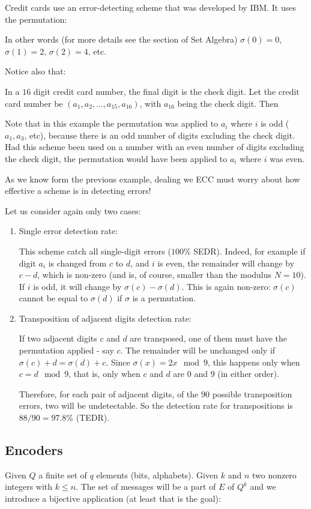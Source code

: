 	Credit cards use an error-detecting scheme that was developed by IBM. It uses the permutation:
	
	In other words (for more details see the section of Set Algebra) $\sigma (0)=0$, $\sigma (1)=2$, $\sigma (2)=4$, etc.
	
	Notice also that:
	

	In a $16$ digit credit card number, the final digit is the check digit. Let the credit card number be $(a_1, a_2,\ldots , a_{15}, a_{16})$, with $a_{16}$ being the check digit. Then
	
	Note that in this example the permutation was applied to $a_ i$ where $i$ is odd ($a_1, a_3$, etc), because there is an odd number of digits excluding the check digit. Had this scheme been used on a number with an even number of digits excluding the check digit, the permutation would have been applied to $a_ i$ where $i$ was even.
	
	As we know form the previous example, dealing we ECC must worry about how effective a scheme is in detecting errors!
	
	Let us consider again only two cases:
	\begin{enumerate}
		\item Single error detection rate:

		This scheme catch all single-digit errors ($100\%$ SEDR). Indeed, for example if digit $a_ i$ is changed from $c$ to $d$, and $i$ is even, the remainder will change by $c-d$, which is non-zero (and is, of course, smaller than the modulus $N=10$). If $i$ is odd, it will change by $\sigma (c)-\sigma (d)$. This is again non-zero: $\sigma (c)$ cannot be equal to $\sigma (d)$ if $\sigma $ is a permutation.

		\item Transposition of adjacent digits detection rate:
		
		If two adjacent digits $c$ and $d$ are transposed, one of them must have the permutation applied - say $c$. The remainder will be unchanged only if $\sigma (c)+d = \sigma (d)+c$. Since $\sigma (x) = 2x \mod 9$, this happens only when $c = d \mod 9$, that is, only when $c$ and $d$ are $0$ and $9$ (in either order).
		
		Therefore, for each pair of adjacent digits, of the $90$ possible transposition errors, two will be undetectable. So the detection rate for transpositions is $88/90 = 97.8\% $ (TEDR).
	\end{enumerate}
	
	\subsection{Encoders}
	Given $Q$ a finite set of $q$ elements (bits, alphabets). Given $k$ and $n$ two  nonzero integers with $k\leq n$. The set of messages will be a part of $E$ of $Q^k$ and we introduce a bijective application (at least that is the goal):
	
